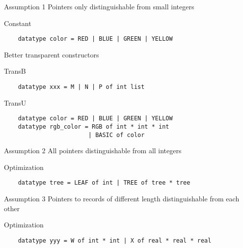 \documentclass[presentation]{beamer}
\begin{document}
\begin{frame}[fragile]{Assumption 1}
 Pointers only distinguishable from small integers
 \pause
  \begin{block}{Constant}
\begin{verbatim}
    datatype color = RED | BLUE | GREEN | YELLOW
\end{verbatim}
  \end{block}
  \pause
  \begin{block}{Better transparent constructors}
    \begin{block}{TransB}
\begin{verbatim}
    datatype xxx = M | N | P of int list
\end{verbatim}
    \end{block}
    \begin{block}{TransU}
\begin{verbatim}
    datatype color = RED | BLUE | GREEN | YELLOW
    datatype rgb_color = RGB of int * int * int
                        | BASIC of color
\end{verbatim}
    \end{block}
  \end{block}
\end{frame}

\begin{frame}[fragile]{Assumption 2}
 All pointers distinguishable from all integers
  \pause
  \begin{block}{Optimization}
\begin{verbatim}
    datatype tree = LEAF of int | TREE of tree * tree
\end{verbatim}
  \end{block}
\end{frame}

\begin{frame}[fragile]{Assumption 3}
 Pointers to records of different length distinguishable from each other
\pause
  \begin{block}{Optimization}
\begin{verbatim}
    datatype yyy = W of int * int | X of real * real * real
\end{verbatim}
  \end{block}
\end{frame}
\end{document}
